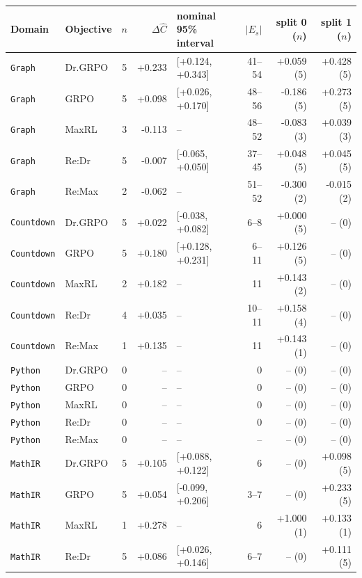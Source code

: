\begin{table}[!htbp]
\centering
\scriptsize
\setlength{\tabcolsep}{3pt}
\begin{tabular}{@{}llcrlrrr@{}}
\toprule
Domain & Objective & $n$ & $\Delta\widehat C$ & nominal 95\% interval & $|E_s|$ & split 0 ($n$) & split 1 ($n$) \\
\midrule
\texttt{Graph} & Dr.GRPO & 5 & +0.233 & [+0.124, +0.343] & 41--54 & +0.059 (5) & +0.428 (5) \\
\texttt{Graph} & GRPO & 5 & +0.098 & [+0.026, +0.170] & 48--56 & -0.186 (5) & +0.273 (5) \\
\texttt{Graph} & MaxRL & 3 & -0.113 & -- & 48--52 & -0.083 (3) & +0.039 (3) \\
\texttt{Graph} & Re:Dr & 5 & -0.007 & [-0.065, +0.050] & 37--45 & +0.048 (5) & +0.045 (5) \\
\texttt{Graph} & Re:Max & 2 & -0.062 & -- & 51--52 & -0.300 (2) & -0.015 (2) \\
\texttt{Countdown} & Dr.GRPO & 5 & +0.022 & [-0.038, +0.082] & 6--8 & +0.000 (5) & -- (0) \\
\texttt{Countdown} & GRPO & 5 & +0.180 & [+0.128, +0.231] & 6--11 & +0.126 (5) & -- (0) \\
\texttt{Countdown} & MaxRL & 2 & +0.182 & -- & 11 & +0.143 (2) & -- (0) \\
\texttt{Countdown} & Re:Dr & 4 & +0.035 & -- & 10--11 & +0.158 (4) & -- (0) \\
\texttt{Countdown} & Re:Max & 1 & +0.135 & -- & 11 & +0.143 (1) & -- (0) \\
\texttt{Python} & Dr.GRPO & 0 & -- & -- & 0 & -- (0) & -- (0) \\
\texttt{Python} & GRPO & 0 & -- & -- & 0 & -- (0) & -- (0) \\
\texttt{Python} & MaxRL & 0 & -- & -- & 0 & -- (0) & -- (0) \\
\texttt{Python} & Re:Dr & 0 & -- & -- & 0 & -- (0) & -- (0) \\
\texttt{Python} & Re:Max & 0 & -- & -- & -- & -- (0) & -- (0) \\
\texttt{MathIR} & Dr.GRPO & 5 & +0.105 & [+0.088, +0.122] & 6 & -- (0) & +0.098 (5) \\
\texttt{MathIR} & GRPO & 5 & +0.054 & [-0.099, +0.206] & 3--7 & -- (0) & +0.233 (5) \\
\texttt{MathIR} & MaxRL & 1 & +0.278 & -- & 6 & +1.000 (1) & +0.133 (1) \\
\texttt{MathIR} & Re:Dr & 5 & +0.086 & [+0.026, +0.146] & 6--7 & -- (0) & +0.111 (5) \\

\end{tabular}
\end{table}
